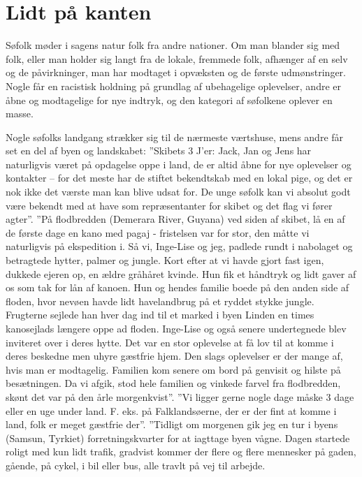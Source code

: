 \chapter{Lidt på kanten}\label{lidt-puxe5-kanten}

Søfolk møder i sagens natur folk fra andre nationer. Om man blander sig
med folk, eller man holder sig langt fra de lokale, fremmede folk,
afhænger af en selv og de påvirkninger, man har modtaget i opvæksten og
de første udmønstringer. Nogle får en racistisk holdning på grundlag af
ubehagelige oplevelser, andre er åbne og modtagelige for nye indtryk, og
den kategori af søfolkene oplever en masse.

Nogle søfolks landgang strækker sig til de nærmeste værtshuse, mens
andre får set en del af byen og landskabet: ''Skibets 3 J'er: Jack, Jan
og Jens har naturligvis været på opdagelse oppe i land, de er altid åbne
for nye oplevelser og kontakter -- for det meste har de stiftet
bekendtskab med en lokal pige, og det er nok ikke det værste man kan
blive udsat for. De unge søfolk kan vi absolut godt være bekendt med at
have som repræsentanter for skibet og det flag vi fører agter''. ''På
flodbredden (Demerara River, Guyana) ved siden af skibet, lå en af de
første dage en kano med pagaj - fristelsen var for stor, den måtte vi
naturligvis på ekspedition i. Så vi, Inge-Lise og jeg, padlede rundt i
nabolaget og betragtede hytter, palmer og jungle. Kort efter at vi havde
gjort fast igen, dukkede ejeren op, en ældre gråhåret kvinde. Hun fik et
håndtryk og lidt gaver af os som tak for lån af kanoen. Hun og hendes
familie boede på den anden side af floden, hvor nevøen havde lidt
havelandbrug på et ryddet stykke jungle. Frugterne sejlede han hver dag
ind til et marked i byen Linden en times kanosejlads længere oppe ad
floden. Inge-Lise og også senere undertegnede blev inviteret over i
deres hytte. Det var en stor oplevelse at få lov til at komme i deres
beskedne men uhyre gæstfrie hjem. Den slags oplevelser er der mange af,
hvis man er modtagelig. Familien kom senere om bord på genvisit og
hilste på besætningen. Da vi afgik, stod hele familien og vinkede farvel
fra flodbredden, skønt det var på den årle morgenkvist''. ''Vi ligger
gerne nogle dage måske 3 dage eller en uge under land. F. eks. på
Falklandsøerne, der er der fint at komme i land, folk er meget gæstfrie
der''. ''Tidligt om morgenen gik jeg en tur i byens (Samsun, Tyrkiet)
forretningskvarter for at iagttage byen vågne. Dagen startede roligt med
kun lidt trafik, gradvist kommer der flere og flere mennesker på gaden,
gående, på cykel, i bil eller bus, alle travlt på vej til arbejde.
